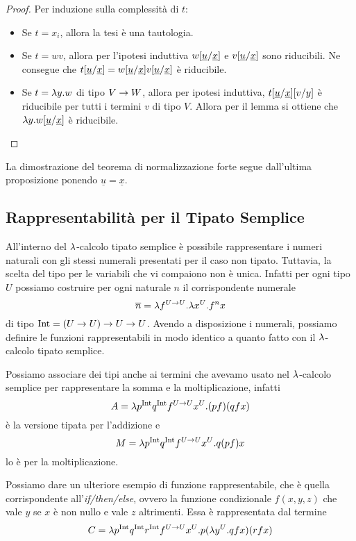 \documentclass[]{marticle}
\begin{document}
\begin{proof}
    Per induzione sulla complessit\`a di $t$:
    \begin{itemize}
        \item Se $t=x_i$, allora la tesi \`e una tautologia.
        \item Se $t=wv$, allora per l'ipotesi induttiva $w[\underline{u}/\underline{x}]$ e $v[\underline{u}/\underline{x}]$ sono
            riducibili. Ne consegue che $t[\underline{u}/\underline{x}] =
            w[\underline{u}/\underline{x}] v[\underline{u}/\underline{x}]$ \`e riducibile.
        \item Se $t=\lambda y. w$ di tipo $V\rightarrow W$, allora per ipotesi induttiva,
            $t[\underline{u}/\underline{x}] [v/y]$ \`e riducibile per
            tutti i termini $v$ di tipo $V$. Allora per il lemma  si ottiene che $\lambda y. w[\underline{u}/\underline{x}]$
            \`e riducibile.
    \end{itemize}
\end{proof}

La dimostrazione del teorema di normalizzazione forte segue dall'ultima
proposizione ponendo $\underline{u} = \underline{x}$.


\subsection{Rappresentabilit\`a per il Tipato Semplice}

All'interno del $\lambda$-calcolo tipato semplice \`e possibile rappresentare i
numeri naturali con gli stessi numerali presentati per il caso non tipato.
Tuttavia, la scelta del tipo per le variabili che vi compaiono non \`e unica.
Infatti per ogni tipo $U$ possiamo costruire per ogni naturale $n$ il
corrispondente numerale
\[
    \overline{n} = \lambda f^{U\rightarrow U} .\lambda x^U. f^n x
\]
di tipo $\text{Int} = (U\rightarrow U) \rightarrow U \rightarrow U$. Avendo a disposizione i numerali,
possiamo definire le funzioni rappresentabili in modo identico a quanto fatto
con il $\lambda$-calcolo tipato semplice.

Possiamo associare dei tipi anche ai termini che avevamo usato nel $\lambda$-calcolo
semplice per rappresentare la somma e la moltiplicazione, infatti 
\[
    A = \lambda p^{\text{Int}} q^{\text{Int}} f^{U\rightarrow U}x^U. (pf)(qfx)
\]
\`e la versione tipata per l'addizione e 
\[
    M = \lambda p^{\text{Int}} q^{\text{Int}} f^{U\rightarrow U}x^U. q (p f) x
\]
lo \`e per la moltiplicazione.

Possiamo dare un ulteriore esempio di funzione rappresentabile, che \`e quella
corrispondente all'\textit{if/then/else}, ovvero la funzione condizionale
$f(x,y,z)$ che vale $y$ se $x$ \`e non nullo e vale $z$ altrimenti. Essa \`e
rappresentata dal termine
\[
    C = \lambda p^{\text{Int}} q^{\text{Int}} r^{\text{Int}} f^{U\rightarrow U} x^U. p (\lambda y^U. qfx)(rfx)
\]
\end{document}

